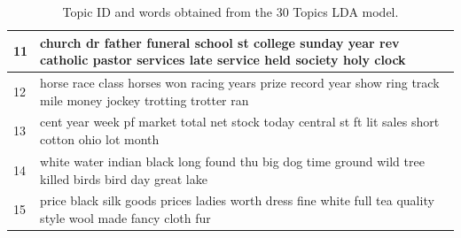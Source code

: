 \documentclass{beamer}
\begin{document}
\begin{frame}
{\begin{minipage}{1.53846\textwidth}
\begin{table}
\begin{tabular}{|p{1cm}|p{16cm}|}
    11       & church dr father funeral school st college sunday year rev catholic pastor services late service held society holy clock                              \\ \hline
    12       & horse race class horses won racing years prize record year show ring track mile money jockey trotting trotter ran                                     \\ \hline
    13       & cent year week pf market total net stock today central st ft lit sales short cotton ohio lot month                                                    \\ \hline
    14       & white water indian black long found thu big dog time ground wild tree killed birds bird day great lake                                                \\ \hline
    15       & price black silk goods prices ladies worth dress fine white full tea quality style wool made fancy cloth fur                                          \\ \hline
     \end{tabular}
\caption{ Topic ID and words obtained from the 30 Topics LDA model.}
\end{table}
\end{minipage}}
\end{frame}
\end{document}
